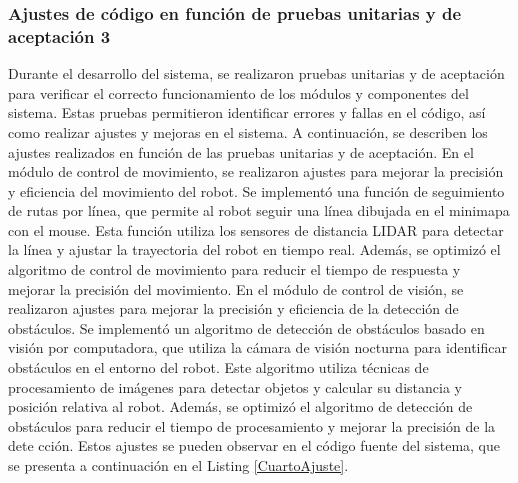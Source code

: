 \subsubsection{Ajustes de c\'odigo en funci\'on de pruebas unitarias y de aceptaci\'on 3} %
\label{sub:Ajustes de c\'odigo en funci\'on de pruebas unitarias y de aceptaci\'on}
    Durante el desarrollo del sistema, se realizaron pruebas unitarias y de aceptaci\'on para verificar el correcto funcionamiento 
        de los m\'odulos y componentes del sistema. Estas pruebas permitieron identificar errores y fallas en el c\'odigo, 
        as\'i como realizar ajustes y mejoras en el sistema. A continuaci\'on, se describen los ajustes realizados en funci\'on 
        de las pruebas unitarias y de aceptaci\'on.
    \vskip 0.5cm
    En el m\'odulo de control de movimiento, se realizaron ajustes para mejorar la precisi\'on y eficiencia del movimiento del robot. 
        Se implement\'o una funci\'on de seguimiento de rutas por l\'inea, que permite al robot seguir una l\'inea dibujada en el 
        minimapa con el mouse. Esta funci\'on utiliza los sensores de distancia LIDAR para detectar la l\'inea y ajustar la 
        trayectoria del robot en tiempo real. Adem\'as, se optimiz\'o el algoritmo de control de movimiento para reducir 
        el tiempo de respuesta y mejorar la precisi\'on del movimiento.
    \vskip 0.5cm
    En el m\'odulo de control de visi\'on, se realizaron ajustes para mejorar la precisi\'on y eficiencia de la detecci\'on de obst\'aculos. 
        Se implement\'o un algoritmo de detecci\'on de obst\'aculos basado en visi\'on por computadora, que utiliza la c\'amara de 
        visi\'on nocturna para identificar obst\'aculos en el entorno del robot. Este algoritmo utiliza t\'ecnicas de procesamiento 
        de im\'agenes para detectar objetos y calcular su distancia y posici\'on relativa al robot. Adem\'as, se optimiz\'o el 
        algoritmo de detecci\'on de obst\'aculos para reducir el tiempo de procesamiento y mejorar la precisi\'on de la dete
        cci\'on.
    \vskip 0.5cm
    Estos ajustes se pueden observar en el c\'odigo fuente del sistema, que se presenta a continuaci\'on en el Listing \ref{CuartoAjuste}.
